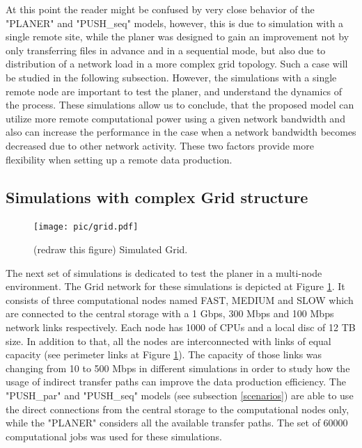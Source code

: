 \documentclass{svjour3}                     %
\begin{document}

At this point the reader might be confused by very close behavior of the "PLANER" and "PUSH\_seq" models, however, this is due to simulation with a single remote site, while the planer was designed to gain an improvement not by only  transferring files in advance and in a sequential mode, but also due to distribution of a network load in a more complex grid topology. Such a case will be studied in the following subsection. However, the simulations with a single remote node are important to test the planer, and understand the dynamics of the process. These simulations allow us to conclude, that the proposed model can utilize more remote computational power using a given network bandwidth and also can increase the performance in the case when a network bandwidth becomes decreased due to other network activity. These two factors provide more flexibility when setting up a remote data production.


\subsection{Simulations with complex Grid structure}
\begin{figure}[h]
  \begin{center}
    \texttt{[image: pic/grid.pdf]}
    \caption{(redraw this figure) Simulated Grid.}
    \label{simulated_grid}	
  \end{center}  
\end{figure}
The next set of simulations is dedicated to test the planer in a multi-node environment. The Grid network for these simulations is depicted at Figure \ref{simulated_grid}. It consists of three computational nodes named FAST, MEDIUM and SLOW which are connected to the central storage with a 1 Gbps, 300 Mbps and 100 Mbps network links respectively. Each node has 1000 of CPUs and a local disc of 12 TB size. In addition to that, all the nodes are interconnected with links of equal capacity (see perimeter links at Figure \ref{simulated_grid}). The capacity of those links was changing from 10 to 500 Mbps in different simulations in order to study how the usage of indirect transfer paths can improve the data production efficiency. The "PUSH\_par" and "PUSH\_seq" models (see subsection \ref{scenarios}) are able to use the direct connections from the central storage to the computational nodes only, while the "PLANER" considers all the available transfer paths. The set of 60000 computational jobs was used for these simulations.
\end{document}
